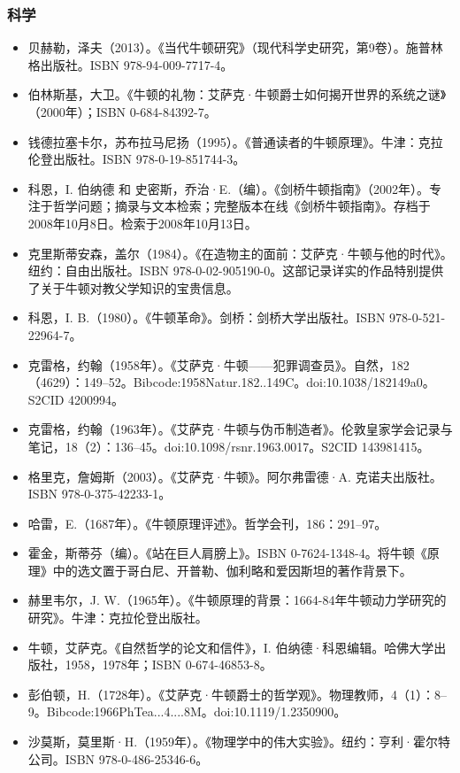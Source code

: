 \subsubsection{科学}
\begin{itemize}
\item 贝赫勒，泽夫（2013）。《当代牛顿研究》（现代科学史研究，第9卷）。施普林格出版社。ISBN 978-94-009-7717-4。
\item 伯林斯基，大卫。《牛顿的礼物：艾萨克·牛顿爵士如何揭开世界的系统之谜》（2000年）；ISBN 0-684-84392-7。
\item 钱德拉塞卡尔，苏布拉马尼扬（1995）。《普通读者的牛顿原理》。牛津：克拉伦登出版社。ISBN 978-0-19-851744-3。
\item 科恩，I. 伯纳德 和 史密斯，乔治·E.（编）。《剑桥牛顿指南》（2002年）。专注于哲学问题；摘录与文本检索；完整版本在线《剑桥牛顿指南》。存档于2008年10月8日。检索于2008年10月13日。
\item 克里斯蒂安森，盖尔（1984）。《在造物主的面前：艾萨克·牛顿与他的时代》。纽约：自由出版社。ISBN 978-0-02-905190-0。这部记录详实的作品特别提供了关于牛顿对教父学知识的宝贵信息。
\item 科恩，I. B.（1980）。《牛顿革命》。剑桥：剑桥大学出版社。ISBN 978-0-521-22964-7。
\item 克雷格，约翰（1958年）。《艾萨克·牛顿——犯罪调查员》。自然，182（4629）：149–52。Bibcode:1958Natur.182..149C。doi:10.1038/182149a0。S2CID 4200994。
\item 克雷格，约翰（1963年）。《艾萨克·牛顿与伪币制造者》。伦敦皇家学会记录与笔记，18（2）：136–45。doi:10.1098/rsnr.1963.0017。S2CID 143981415。
\item 格里克，詹姆斯（2003）。《艾萨克·牛顿》。阿尔弗雷德·A. 克诺夫出版社。ISBN 978-0-375-42233-1。
\item 哈雷，E.（1687年）。《牛顿原理评述》。哲学会刊，186：291–97。
\item 霍金，斯蒂芬（编）。《站在巨人肩膀上》。ISBN 0-7624-1348-4。将牛顿《原理》中的选文置于哥白尼、开普勒、伽利略和爱因斯坦的著作背景下。
\item 赫里韦尔，J. W.（1965年）。《牛顿原理的背景：1664-84年牛顿动力学研究的研究》。牛津：克拉伦登出版社。
\item 牛顿，艾萨克。《自然哲学的论文和信件》，I. 伯纳德·科恩编辑。哈佛大学出版社，1958，1978年；ISBN 0-674-46853-8。
\item 彭伯顿，H.（1728年）。《艾萨克·牛顿爵士的哲学观》。物理教师，4（1）：8–9。Bibcode:1966PhTea...4....8M。doi:10.1119/1.2350900。
\item 沙莫斯，莫里斯·H.（1959年）。《物理学中的伟大实验》。纽约：亨利·霍尔特公司。ISBN 978-0-486-25346-6。
\end{itemize}
